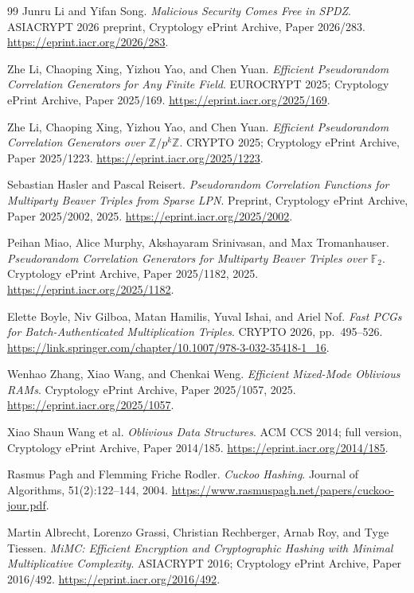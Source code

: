 \documentclass[11pt]{article}
\begin{document}
\begin{thebibliography}{99}
Junru Li and Yifan Song.
\emph{Malicious Security Comes Free in SPDZ}.
ASIACRYPT 2026 preprint, Cryptology ePrint Archive, Paper 2026/283.
\url{https://eprint.iacr.org/2026/283}.

Zhe Li, Chaoping Xing, Yizhou Yao, and Chen Yuan.
\emph{Efficient Pseudorandom Correlation Generators for Any Finite Field}.
EUROCRYPT 2025; Cryptology ePrint Archive, Paper 2025/169.
\url{https://eprint.iacr.org/2025/169}.

Zhe Li, Chaoping Xing, Yizhou Yao, and Chen Yuan.
\emph{Efficient Pseudorandom Correlation Generators over $\mathbb{Z}/p^k\mathbb{Z}$}.
CRYPTO 2025; Cryptology ePrint Archive, Paper 2025/1223.
\url{https://eprint.iacr.org/2025/1223}.

Sebastian Hasler and Pascal Reisert.
\emph{Pseudorandom Correlation Functions for Multiparty Beaver Triples from Sparse LPN}.
Preprint, Cryptology ePrint Archive, Paper 2025/2002, 2025.
\url{https://eprint.iacr.org/2025/2002}.

Peihan Miao, Alice Murphy, Akshayaram Srinivasan, and Max Tromanhauser.
\emph{Pseudorandom Correlation Generators for Multiparty Beaver Triples over $\mathbb{F}_2$}.
Cryptology ePrint Archive, Paper 2025/1182, 2025.
\url{https://eprint.iacr.org/2025/1182}.

Elette Boyle, Niv Gilboa, Matan Hamilis, Yuval Ishai, and Ariel Nof.
\emph{Fast PCGs for Batch-Authenticated Multiplication Triples}.
CRYPTO 2026, pp.~495--526.
\url{https://link.springer.com/chapter/10.1007/978-3-032-35418-1_16}.

Wenhao Zhang, Xiao Wang, and Chenkai Weng.
\emph{Efficient Mixed-Mode Oblivious RAMs}.
Cryptology ePrint Archive, Paper 2025/1057, 2025.
\url{https://eprint.iacr.org/2025/1057}.

Xiao Shaun Wang et al.
\emph{Oblivious Data Structures}.
ACM CCS 2014; full version, Cryptology ePrint Archive, Paper 2014/185.
\url{https://eprint.iacr.org/2014/185}.

Rasmus Pagh and Flemming Friche Rodler.
\emph{Cuckoo Hashing}.
Journal of Algorithms, 51(2):122--144, 2004.
\url{https://www.rasmuspagh.net/papers/cuckoo-jour.pdf}.

Martin Albrecht, Lorenzo Grassi, Christian Rechberger, Arnab Roy, and Tyge Tiessen.
\emph{MiMC: Efficient Encryption and Cryptographic Hashing with Minimal Multiplicative Complexity}.
ASIACRYPT 2016; Cryptology ePrint Archive, Paper 2016/492.
\url{https://eprint.iacr.org/2016/492}.


\end{thebibliography}
\end{document}
